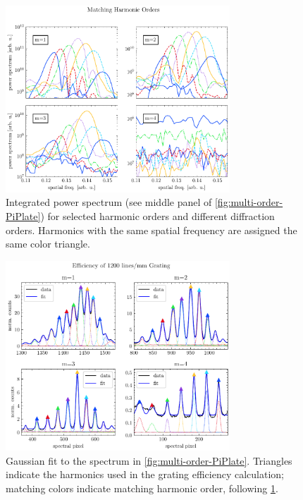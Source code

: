 \begin{figure}
	\centering
	\includegraphics[width=0.75\textwidth]{figures/chap2/twosource-matching-HO.pdf}
	\caption{Integrated power spectrum (see middle panel of \cref{fig:multi-order-PiPlate}) for selected harmonic orders and different diffraction orders. Harmonics with the same spatial frequency are assigned the same color triangle.}
	\label{fig:twosource-matching-HO}
\end{figure}

\begin{figure}
	\centering
	\includegraphics[width=0.75\textwidth]{figures/chap2/grating-efficiency.pdf}
	\caption{Gaussian fit to the spectrum in \cref{fig:multi-order-PiPlate}. Triangles indicate the harmonics used in the grating efficiency calculation; matching colors indicate matching harmonic order, following \cref{fig:twosource-matching-HO}.}
	\label{fig:grating-efficiency}
\end{figure}


